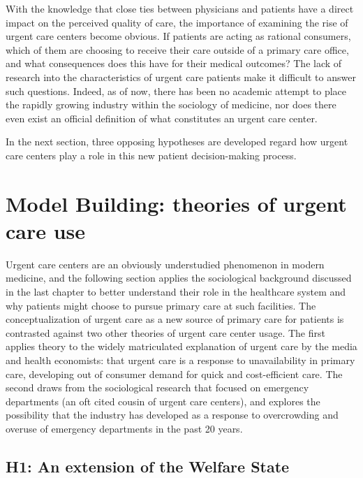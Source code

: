 \documentclass[12pt,twoside]{reedthesis}
\begin{document}
  With the knowledge that close ties between physicians and patients have
  a direct impact on the perceived quality of care, the importance of
  examining the rise of urgent care centers become obvious. If patients
  are acting as rational consumers, which of them are choosing to receive
  their care outside of a primary care office, and what consequences does
  this have for their medical outcomes? The lack of research into the
  characteristics of urgent care patients make it difficult to answer such
  questions. Indeed, as of now, there has been no academic attempt to
  place the rapidly growing industry within the sociology of medicine, nor
  does there even exist an official definition of what constitutes an
  urgent care center.
  
  In the next section, three opposing hypotheses are developed regard how
  urgent care centers play a role in this new patient decision-making
  process.
  
  \chapter{Model Building: theories of urgent care
  use}\label{model-building-theories-of-urgent-care-use}
  
  \setcounter{chapter}{3} \setcounter{section}{0} \doublespacing
  
  Urgent care centers are an obviously understudied phenomenon in modern
  medicine, and the following section applies the sociological background
  discussed in the last chapter to better understand their role in the
  healthcare system and why patients might choose to pursue primary care
  at such facilities. The conceptualization of urgent care as a new source
  of primary care for patients is contrasted against two other theories of
  urgent care center usage. The first applies theory to the widely
  matriculated explanation of urgent care by the media and health
  economists: that urgent care is a response to unavailability in primary
  care, developing out of consumer demand for quick and cost-efficient
  care. The second draws from the sociological research that focused on
  emergency departments (an oft cited cousin of urgent care centers), and
  explores the possibility that the industry has developed as a response
  to overcrowding and overuse of emergency departments in the past 20
  years.
  
  \section*{H1: An extension of the Welfare
  State}\label{h1-an-extension-of-the-welfare-state}
  
\end{document}
